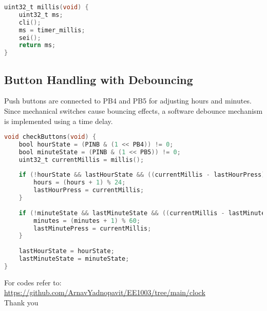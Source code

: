 \documentclass{article}
\begin{document}
\begin{lstlisting}[language=C, caption=Time Keeping]
uint32_t millis(void) {
    uint32_t ms;
    cli();
    ms = timer_millis;
    sei();
    return ms;
}
\end{lstlisting}

\subsection{Button Handling with Debouncing}
Push buttons are connected to PB4 and PB5 for adjusting hours and minutes. Since mechanical switches cause bouncing effects, a software debounce mechanism is implemented using a time delay.

\begin{lstlisting}[language=C, caption=Button Debouncing]
void checkButtons(void) {
    bool hourState = (PINB & (1 << PB4)) != 0;
    bool minuteState = (PINB & (1 << PB5)) != 0;
    uint32_t currentMillis = millis();
    
    if (!hourState && lastHourState && ((currentMillis - lastHourPress) > debounceDelay)) {
        hours = (hours + 1) % 24;
        lastHourPress = currentMillis;
    }
    
    if (!minuteState && lastMinuteState && ((currentMillis - lastMinutePress) > debounceDelay)) {
        minutes = (minutes + 1) % 60;
        lastMinutePress = currentMillis;
    }
    
    lastHourState = hourState;
    lastMinuteState = minuteState;
}
\end{lstlisting}
For codes refer to:\\
\url{https://github.com/ArnavYadnopavit/EE1003/tree/main/clock}\\

\centering
Thank you
\end{document}
